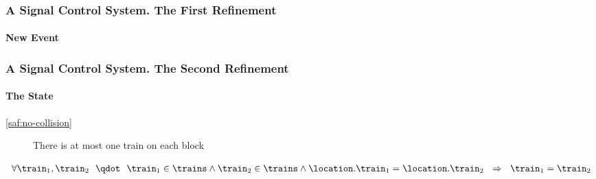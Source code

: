 \begin{frame}
  \frametitle{A Signal Control System. The First Refinement}
  \framesubtitle{New Event \moveout}

  \begin{Reason}
  \end{Reason}
  
\end{frame}

\begin{frame}
  \frametitle{A Signal Control System. The Second Refinement}
  \framesubtitle{The State}
  
  \begin{description}
  \item[\ref{saf:no-collision}] {There is at most one train on each block}\ReqSpacing
  \end{description}
  \medskip
  \begin{Bcode}
    $
    \invariants[off]{
      \forall \train_1, \train_2 \Wide\qdot \train_1 \in \trains \land \train_2 \in \trains \land \location.\train_1 =
        \location.\train_2 \Wide\limp \train_1 = \train_2
    }
    $
  \end{Bcode}
\end{frame}

